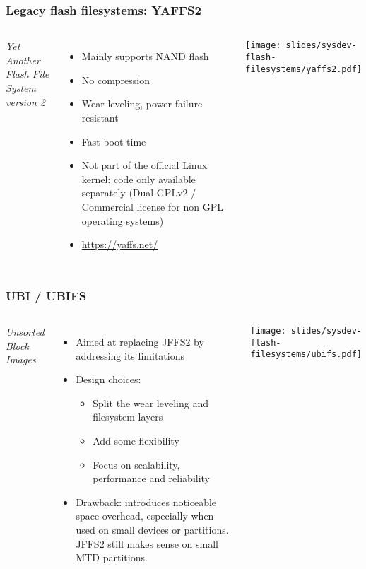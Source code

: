 \begin{frame}
  \frametitle{Legacy flash filesystems: YAFFS2}
  \begin{columns}
    {\em Yet Another Flash File System version 2}
    \begin{itemize}
    \item Mainly supports NAND flash
    \item No compression
    \item Wear leveling, power failure resistant
    \item Fast boot time
    \item Not part of the official Linux kernel: code only available
      separately (Dual GPLv2 / Commercial license for non GPL
      operating systems)
    \item \url{https://yaffs.net/}
    \end{itemize}
    \texttt{[image: slides/sysdev-flash-filesystems/yaffs2.pdf]}
  \end{columns}
\end{frame}


\begin{frame}
  \frametitle{UBI / UBIFS}
  \begin{columns}
    {\em Unsorted Block Images}
    \begin{itemize}
    \item Aimed at replacing JFFS2 by addressing its limitations
    \item Design choices:
      \begin{itemize}
      \item Split the wear leveling and filesystem layers
      \item Add some flexibility
      \item Focus on scalability, performance and reliability
      \end{itemize}
    \item Drawback: introduces noticeable space overhead,
      especially when used on small devices or partitions. JFFS2
      still makes sense on small MTD partitions.
    \end{itemize}
    \texttt{[image: slides/sysdev-flash-filesystems/ubifs.pdf]}
  \end{columns}
\end{frame}

